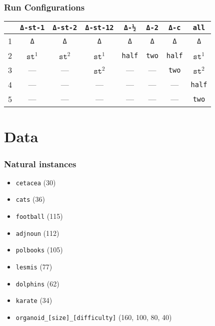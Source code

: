 \documentclass{beamer}
\begin{document}
\begin{frame}
	\frametitle{Run Configurations}
\begin{table}
\centering
\begin{tabular}{lccccccc}
\toprule
  & \texttt{Δ-st-1} & \texttt{Δ-st-2} & \texttt{Δ-st-12}	& \texttt{Δ-½}	& \texttt{Δ-2} 	& \texttt{Δ-c}	& \texttt{all}  	\\
\midrule
1 & \texttt{Δ}      & \texttt{Δ}      & \texttt{Δ}      	& \texttt{Δ}	& \texttt{Δ}	& \texttt{Δ}	& \texttt{Δ} 		\\
2 & $\texttt{st}^1$ & $\texttt{st}^2$ & $\texttt{st}^1$ 	& \texttt{half}	& \texttt{two} 	& \texttt{half}	& $\texttt{st}^1$  	\\
3 & —               & —               & $\texttt{st}^2$ 	& —    			& —   		   	& \texttt{two}  & $\texttt{st}^2$  	\\
4 & —               & —               & —               	& —    			& —   		   	& —      		& \texttt{half}     \\
5 & —               & —               & —               	& —    			& — 			& —      		& \texttt{two}      \\
\bottomrule
\end{tabular}
\end{table}
\end{frame}

\section{Data}
\begin{frame}
	\frametitle{Natural instances}	
	\begin{itemize}
		\item<1-> \texttt{cetacea} (30) \cite{grotschelCuttingPlaneAlgorithm1989}
		\item<1-> \texttt{cats} (36)
		\item<2-> \texttt{football} (115) \cite{kappesComparativeStudyModern2015}
		\item<2-> \texttt{adjnoun} (112)
		\item<2-> \texttt{polbooks} (105)
		\item<2-> \texttt{lesmis} (77)
		\item<2-> \texttt{dolphins} (62)
		\item<2-> \texttt{karate} (34)
		\item<3-> \texttt{organoid\_[size]\_[difficulty]} (160, 100, 80, 40) \cite{presbergerSegmentationClusteringOrganoids2023}
	\end{itemize}
\end{frame}
\end{document}

